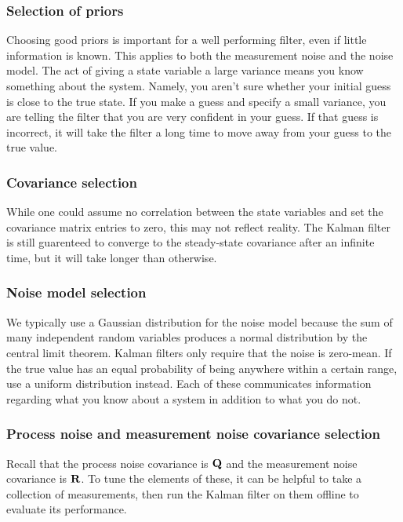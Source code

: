 \subsubsection{Selection of priors}

Choosing good priors is important for a well performing filter, even if little
information is known. This applies to both the measurement noise and the noise
\gls{model}. The act of giving a \gls{state} variable a large variance means you
know something about the \gls{system}. Namely, you aren't sure whether your
initial guess is close to the true \gls{state}. If you make a guess and specify
a small variance, you are telling the filter that you are very confident in your
guess. If that guess is incorrect, it will take the filter a long time to move
away from your guess to the true value.

\subsubsection{Covariance selection}

While one could assume no correlation between the \gls{state} variables and set
the covariance matrix entries to zero, this may not reflect reality. The Kalman
filter is still guarenteed to converge to the steady-state covariance after an
infinite time, but it will take longer than otherwise.

\subsubsection{Noise model selection}

We typically use a Gaussian distribution for the noise \gls{model} because the
sum of many independent random variables produces a normal distribution by the
central limit theorem. Kalman filters only require that the noise is zero-mean.
If the true value has an equal probability of being anywhere within a certain
range, use a uniform distribution instead. Each of these communicates
information regarding what you know about a system in addition to what you do
not.

\subsubsection{Process noise and measurement noise covariance selection}

Recall that the process noise covariance is $\mathbf{Q}$ and the measurement noise
covariance is $\mathbf{R}$. To tune the elements of these, it can be helpful to
take a collection of measurements, then run the Kalman filter on them offline to
evaluate its performance.

